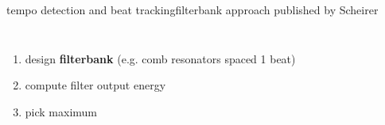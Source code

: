         \begin{frame}{tempo detection and beat tracking}{filterbank approach}
            published by Scheirer
            \begin{columns}[T]
                \begin{enumerate}
                    \item	design \textbf{filterbank} (e.g. comb resonators spaced 1 beat)
                    \item<2->	compute filter output energy	
                    \item<3->	pick maximum
                \end{enumerate}
            \end{columns}
        \end{frame}
